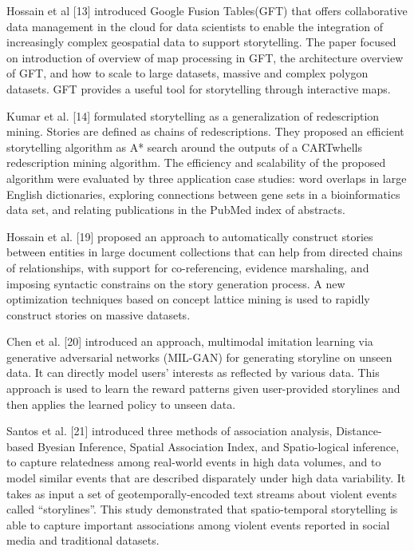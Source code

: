 \documentclass[conference]{IEEEtran}
\begin{document}
Hossain et al [13] introduced Google Fusion Tables(GFT) that offers collaborative data management in the cloud for data scientists to enable the integration of increasingly complex geospatial data to support storytelling. The paper focused on introduction of overview of map processing in GFT, the architecture overview of GFT, and how to scale to large datasets, massive and complex polygon datasets. GFT provides a useful tool for storytelling through interactive maps. 



Kumar et al. [14] formulated storytelling as a generalization of redescription mining. Stories are defined as chains of redescriptions. They proposed an efficient storytelling algorithm as A* search around the outputs of a CARTwhells redescription mining algorithm. The efficiency and scalability of the proposed algorithm were evaluated by three application case studies: word overlaps in large English dictionaries, exploring connections between gene sets in a bioinformatics data set, and relating publications in the PubMed index of abstracts. 



Hossain et al. [19] proposed an approach to automatically construct stories between entities in large document collections that can help from directed chains of relationships, with support for co-referencing, evidence marshaling, and imposing syntactic constrains on the story generation process. A new optimization techniques based on concept lattice mining is used to rapidly construct stories on massive datasets. 



Chen et al. [20] introduced an approach, multimodal imitation learning via generative adversarial networks (MIL-GAN) for generating storyline on unseen data. It can directly model users’ interests as reflected by various data. This approach is used to learn the reward patterns given user-provided storylines and then applies the learned policy to unseen data.   




Santos et al. [21] introduced three methods of association analysis, Distance-based Byesian Inference, Spatial Association Index, and Spatio-logical inference, to capture relatedness among real-world events in high data volumes, and to model similar events that are described disparately under high data variability. It takes as input a set of geotemporally-encoded text streams about violent events called “storylines”. This study demonstrated that spatio-temporal storytelling is able to capture important associations among violent events reported in social media and traditional datasets. 
\end{document}
